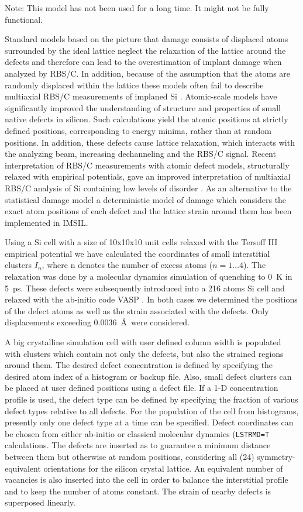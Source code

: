 Note: This model has not been used for a long time. It might not be fully
functional.

Standard models based on the picture that damage consists of displaced atoms
surrounded by the ideal lattice neglect the relaxation of the lattice around
the defects and therefore can lead to the overestimation of implant damage
when analyzed by RBS/C\nocite{I6902}.  In addition, because of the assumption
that the atoms are randomly displaced within the lattice these models often fail
to describe multiaxial RBS/C measurements of implaned Si \cite{Lul04}. 
Atomic-scale models \cite{Ric04,Leu99,Koh99} have significantly improved the
understanding of structure and properties of small native defects in silicon. 
Such calculations yield the atomic positions at strictly defined positions,
corresponding to energy minima, rather than at random positions.  In addition,
these defects cause lattice relaxation, which interacts with the analyzing beam,
increasing dechanneling and the RBS/C signal. Recent interpretation of RBS/C
measurements with atomic defect models, structurally relaxed with empirical
potentials, gave an improved interpretation of multiaxial RBS/C analysis of Si
containing low levels of disorder \cite{Lul04,Bal02}.  As an alternative to the
statistical damage model a deterministic model of damage which considers the
exact atom positions of each defect and the lattice strain around them has been
implemented in IMSIL.  

Using a Si cell with a size of 10x10x10 unit cells relaxed with the Tersoff
III \cite{I8848} empirical potential we have calculated the coordinates of
small interstitial clusters $I_{n}$, where {n} denotes the number of excess
atoms ($n=1 \ldots 4$).  The relaxation was done by a molecular dynamics
simulation of quenching to 0~K in 5~ps.  These defects were subsequently
introduced into a 216 atoms Si cell and relaxed with the ab-initio code VASP
\cite{Kre96}. In both cases we determined the positions of the defect atoms as
well as the strain associated with the defects. Only displacements exceeding
0.0036~\AA\ were considered. 

A big crystalline simulation cell with user defined column width is
populated with clusters which contain not only the defects, but also the
strained regions around them.  The desired defect concentration is defined
by specifying the desired atom index of a histogram or backup file. Also, small
defect clusters can be placed at user defined positions using a defect file. If 
a 1-D concentration profile is used, the defect type can be defined by
specifying the fraction of various defect types relative to all defects. 
For the population of the cell from histograms, presently only one defect type
at a time can be specified. Defect coordinates can be chosen from either
ab-initio or classical molecular dynamics (\texttt{LSTRMD=T} calculations.  The
defects are inserted as to guarantee a minimum distance between them but
otherwise at random positions, considering all (24) symmetry-equivalent
orientations for the silicon crystal lattice. An equivalent number of vacancies
is also inserted into the cell in order to balance the interstitial profile and
to keep the number of atoms constant. The strain of nearby defects is superposed
linearly.  

